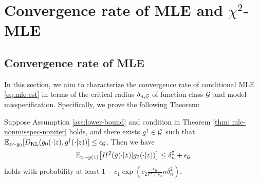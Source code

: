 \section{Convergence rate of MLE and $\chi^2$-MLE}
\subsection{Convergence rate of MLE}
In this section, we aim to characterize the convergence rate of conditional MLE \eqref{eq:mle-est} in terms of the critical radius $\delta_{n,\mathcal{G}}$ of function class $\mathcal{G}$ and model misspecification. Specifically, we prove the following Theorem: 
\begin{theorem}\label{thm:mle-conv-rate}
    Suppose Assumption \ref{ass:lower-bound} and condition in Theorem \ref{thm: mle-nonmisspec-noniter} holds, and there exists $g^{\dagger} \in \mathcal{G}$ such that $\mathbb{E}_{z\sim g_0}[D_{\text{KL}}(g_0(\cdot|z), g^{\dag}(\cdot|z))] \leq \epsilon_{\mathcal{G}}$. Then we have $$
    \mathbb{E}_{z\sim g(z)}\big[H^2(\hat{g}(\cdot|z)| g_0(\cdot|z))\big] \leq \delta_n^2 + \epsilon_{\mathcal{G}}
    $$
    holds with probability at least $1- c_1\exp(c_2 \frac{c_0}{C+c_0}n\delta_n^2)$.
\end{theorem}
